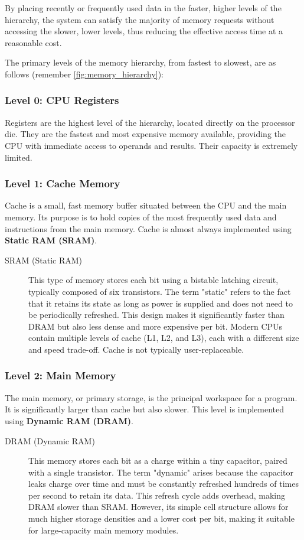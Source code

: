 By placing recently or frequently used data in the faster, higher levels of the hierarchy, the system can satisfy the majority of memory requests without accessing the slower, lower levels, thus reducing the effective access time at a reasonable cost.

The primary levels of the memory hierarchy, from fastest to slowest, are as follows (remember \ref{fig:memory_hierarchy}):

\subsubsection{Level 0: CPU Registers}
Registers are the highest level of the hierarchy, located directly on the processor die. They are the fastest and most expensive memory available, providing the CPU with immediate access to operands and results. Their capacity is extremely limited.

\subsubsection{Level 1: Cache Memory}
Cache is a small, fast memory buffer situated between the CPU and the main memory. Its purpose is to hold copies of the most frequently used data and instructions from the main memory. Cache is almost always implemented using \textbf{Static RAM (SRAM)}.
\begin{description}
    \item[SRAM (Static RAM)] This type of memory stores each bit using a bistable latching circuit, typically composed of six transistors. The term "static" refers to the fact that it retains its state as long as power is supplied and does not need to be periodically refreshed. This design makes it significantly faster than DRAM but also less dense and more expensive per bit. Modern CPUs contain multiple levels of cache (L1, L2, and L3), each with a different size and speed trade-off. Cache is not typically user-replaceable.
\end{description}

\subsubsection{Level 2: Main Memory}
The main memory, or primary storage, is the principal workspace for a program. It is significantly larger than cache but also slower. This level is implemented using \textbf{Dynamic RAM (DRAM)}.
\begin{description}
    \item[DRAM (Dynamic RAM)] This memory stores each bit as a charge within a tiny capacitor, paired with a single transistor. The term "dynamic" arises because the capacitor leaks charge over time and must be constantly refreshed hundreds of times per second to retain its data. This refresh cycle adds overhead, making DRAM slower than SRAM. However, its simple cell structure allows for much higher storage densities and a lower cost per bit, making it suitable for large-capacity main memory modules.
\end{description}

